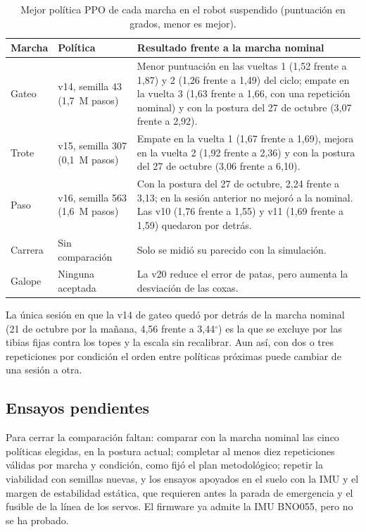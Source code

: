 \begin{table}[H]
\centering
\small
\caption{Mejor política PPO de cada marcha en el robot suspendido (puntuación en grados, menor es mejor).}
\label{tab:mejores-politicas}
\begin{tabular}{>{\raggedright\arraybackslash}p{}>{\raggedright\arraybackslash}p{}>{\raggedright\arraybackslash}p{}}
\toprule
Marcha & Política & Resultado frente a la marcha nominal \\
\midrule
Gateo & v14, semilla 43 (1,7~M pasos) & Menor puntuación en las vueltas 1 (1,52 frente a 1,87) y 2 (1,26 frente a 1,49) del ciclo; empate en la vuelta 3 (1,63 frente a 1,66, con una repetición nominal) y con la postura del 27 de octubre (3,07 frente a 2,92). \\
Trote & v15, semilla 307 (0,1~M pasos) & Empate en la vuelta 1 (1,67 frente a 1,69), mejora en la vuelta 2 (1,92 frente a 2,36) y con la postura del 27 de octubre (3,06 frente a 6,10). \\
Paso & v16, semilla 563 (1,6~M pasos) & Con la postura del 27 de octubre, 2,24 frente a 3,13; en la sesión anterior no mejoró a la nominal. Las v10 (1,76 frente a 1,55) y v11 (1,69 frente a 1,59) quedaron por detrás. \\
Carrera & Sin comparación & Solo se midió su parecido con la simulación. \\
Galope & Ninguna aceptada & La v20 reduce el error de patas, pero aumenta la desviación de las coxas. \\
\bottomrule
\end{tabular}
\end{table}

La única sesión en que la v14 de gateo quedó por detrás de la marcha nominal
(21 de octubre por la mañana, 4,56 frente a 3,44$^\circ$) es la que se excluye
por las tibias fijas contra los topes y la escala sin recalibrar. Aun así, con
dos o tres repeticiones por condición el orden entre políticas próximas puede
cambiar de una sesión a otra.

\subsection{Ensayos pendientes}

Para cerrar la comparación faltan: comparar con la marcha nominal las cinco políticas
elegidas, en la postura actual; completar al menos diez repeticiones válidas por
marcha y condición, como fijó el plan metodológico; repetir la viabilidad con
semillas nuevas, y los ensayos apoyados en el suelo con la IMU y el margen de
estabilidad estática, que requieren antes la parada de emergencia y el fusible de
la línea de los servos. El firmware ya admite la IMU BNO055, pero no se ha probado.

